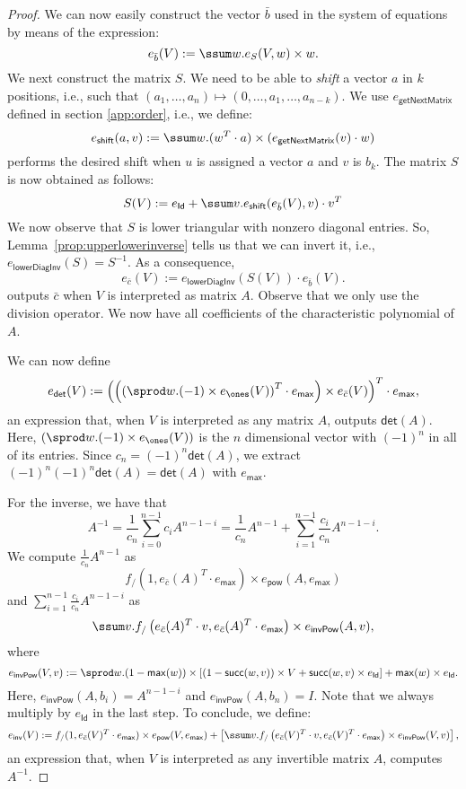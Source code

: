 \begin{proof}
We can now easily construct the vector $\bar b$ used in the system of equations by means of the expression:
$$
e_{\bar b}(V):=\ssum w.e_{S}(V,w)\times w.
$$
We next construct the matrix $S$. We need to be able to \textit{shift} a vector $a$ in $k$ positions, i.e.,
such that $(a_1,\ldots,a_n)\mapsto (0,\ldots,a_1,\ldots,a_{n-k})$. We use $e_{\mathsf{getNextMatrix}}$ 
defined in section \ref{app:order}, i.e., we define:
$$
e_{\mathsf{shift}}(a,v):=\ssum w.(w^T\cdot a)\times(e_{\mathsf{getNextMatrix}}(v)\cdot w)
$$
performs the desired shift when $u$ is assigned a vector $a$ and $v$ is $b_k$. 
The matrix $S$ is now obtained as follows:
$$
S(V):= e_{\mathsf{Id}} + \ssum v. e_{\mathsf{shift}}(e_{\bar b}(V), v)\cdot v^T
$$
We now observe that $S$ is lower triangular with nonzero diagonal entries. So,
Lemma~\ref{prop:upperlowerinverse} tells us that we can invert it, i.e.,
$e_{\mathsf{lowerDiagInv}}(S)=S^{-1}$. As a consequence,
$$
e_{\bar c}(V):=e_{\mathsf{lowerDiagInv}}(S(V))\cdot e_{\bar b}(V).
$$
outputs $\bar c$ when $V$ is interpreted as matrix $A$. Observe that we only use the division operator. We now have all coefficients of the characteristic polynomial of $A$.


We can now define
$$
e_{\mathsf{det}}(V):=\left( \left(\left( \sprod w. (-1)\times e_{\ones}(V)\right)^T\cdot e_{\mathsf{max}}\right) \times e_{\bar c}(V) \right)^T\cdot e_{\mathsf{max}},
$$
an expression that, when $V$ is interpreted as any matrix $A$, outputs $\mathsf{det}(A)$.
Here, $(\sprod w. (-1)\times e_{\ones}(V))$ is the $n$ dimensional vector with $(-1)^n$ in all of its entries.
Since $c_n=(-1)^n\mathsf{det}(A)$, we extract $(-1)^n(-1)^n\mathsf{det}(A)=\mathsf{det}(A)$ with $e_{\mathsf{max}}$.

For the inverse, we have that
$$
A^{-1}=\frac{1}{c_n}\sum_{i=0}^{n-1}c_i A^{n-1-i} = \frac{1}{c_n}A^{n-1} + \sum_{i=1}^{n-1}\frac{c_i}{c_n}A^{n-1-i}.
$$
We compute $\frac{1}{c_n}A^{n-1}$ as
$$
f_{/}(1, e_{\bar c}(A)^T\cdot e_{\mathsf{max}})\times e_{\mathsf{pow}}(A, e_{\mathsf{max}})
$$
and $\sum_{i=1}^{n-1}\frac{c_i}{c_n}A^{n-1-i}$ as
$$
\ssum v. f_{/}\left( e_{\bar c}(A)^T\cdot v, e_{\bar c}(A)^T\cdot e_{\mathsf{max}} \right)\times e_{\mathsf{invPow}}(A, v),
$$
where
$$
e_{\mathsf{invPow}}(V, v):= \sprod w. (1-\mathsf{max}(w)) \times \left[ (1 - \mathsf{succ}(w,v))\times V + \mathsf{succ}(w,v)\times e_{\mathsf{Id}} \right] + \mathsf{max}(w)\times e_{\mathsf{Id}}.
$$
Here, $e_{\mathsf{invPow}}(A, b_i)=A^{n-1-i}$ and $e_{\mathsf{invPow}}(A, b_n)=I$.
Note that we always multiply by $e_{\mathsf{Id}}$ in the last step.
To conclude, we define:
$$
e_{\mathsf{inv}}(V):= f_{/}(1, e_{\bar c}(V)^T\cdot e_{\mathsf{max}})\times e_{\mathsf{pow}}(V, e_{\mathsf{max}}) + \left[ \ssum v. f_{/}\left( e_{\bar c}(V)^T\cdot v, e_{\bar c}(V)^T\cdot e_{\mathsf{max}} \right)\times e_{\mathsf{invPow}}(V, v) \right],
$$
an expression that, when $V$ is interpreted as any invertible matrix $A$, computes $A^{-1}$.
\end{proof}


